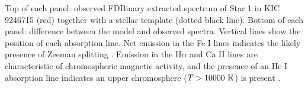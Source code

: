 \label{fig:emission1} Top of each panel: observed FDBinary extracted spectrum of Star 1 in KIC 9246715 (red) together with a stellar template (dotted black line). Bottom of each panel: difference between the model and observed spectra. Vertical lines show the position of each absorption line. Net emission in the Fe I lines indicates the likely presence of Zeeman splitting \citet{har73}. Emission in the H$\alpha$ and Ca II lines are characteristic of chromospheric magnetic activity, and the presence of an He I absorption line indicates an upper chromosphere ($T > 10000 \ \rm{K}$) is present \citep{fro12}.